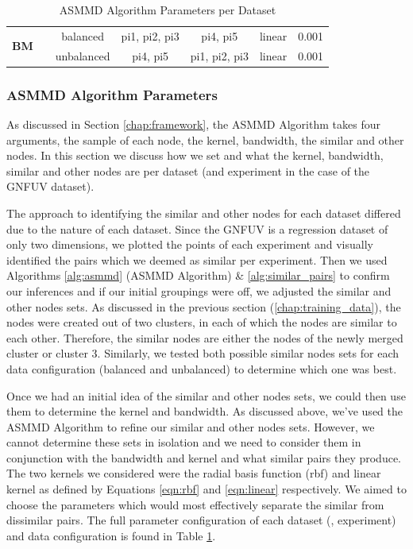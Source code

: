 \documentclass{mpaper}
\begin{document}
\begin{table}[]
\begin{tabular}{|ccc|cccc|}
\multicolumn{1}{|c|}{\multirow{2}{*}{\textbf{BM}}}    & \multicolumn{1}{c|}{}                    & balanced           & \multicolumn{1}{c|}{pi1, pi2, pi3}           & \multicolumn{1}{c|}{pi4, pi5}              & \multicolumn{1}{c|}{linear}          & 0.001              \\
\multicolumn{1}{|c|}{}                                & \multicolumn{1}{c|}{}                    & unbalanced         & \multicolumn{1}{c|}{pi4, pi5}                & \multicolumn{1}{c|}{pi1, pi2, pi3}         & \multicolumn{1}{c|}{linear}          & 0.001              \\ \hline
\end{tabular}
\caption{\label{tab:asmmd_parameters} ASMMD Algorithm Parameters per Dataset}
\end{table}


\subsubsection{ASMMD Algorithm Parameters}\label{chap:asmmd_parameters}

As discussed in Section \ref{chap:framework}, the ASMMD Algorithm  takes four arguments, the sample of each node, the kernel, bandwidth, the similar and other nodes. In this section we discuss how we set and what the kernel, bandwidth, similar and other nodes are per dataset (and experiment in the case of the GNFUV dataset). 

The approach to identifying the similar and other nodes for each dataset differed due to the nature of each dataset. Since the GNFUV is a regression dataset of only two dimensions, we plotted the points of each experiment and visually identified the pairs which we deemed as similar per experiment. Then we used Algorithms \ref{alg:asmmd} (ASMMD Algorithm) \& \ref{alg:similar_pairs} to confirm our inferences and if our initial groupings were off, we adjusted the similar and other nodes sets. As discussed in the previous section (\ref{chap:training_data}), the nodes were created out of two clusters, in each of which the nodes are similar to each other. Therefore, the similar nodes are either the nodes of the newly merged cluster or cluster 3. Similarly, we tested both possible similar nodes sets for each data configuration (balanced and unbalanced) to determine which one was best. 

Once we had an initial idea of the similar and other nodes sets, we could then use them to determine the kernel and bandwidth. As discussed above, we've used the ASMMD Algorithm to refine our similar and other nodes sets. However, we cannot determine these sets in isolation and we need to consider them in conjunction with the bandwidth and kernel and what similar pairs they produce. The two kernels we considered were the radial basis function (rbf) and linear kernel as defined by Equations \ref{eqn:rbf} and \ref{eqn:linear} respectively. We aimed to choose the parameters which would most effectively separate the similar from dissimilar pairs. The full parameter configuration of each dataset (, experiment) and data configuration is found in Table \ref{tab:asmmd_parameters}.
\end{document}
